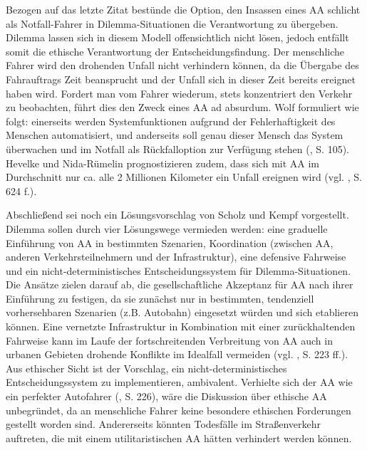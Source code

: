 \documentclass[a4paper, 12pt, titlepage]{scrartcl}
\begin{document}
	Bezogen auf das letzte Zitat best\"unde die Option, den Insassen eines AA schlicht als \glqq Notfall-Fahrer\grqq{} in Dilemma-Situationen die Verantwortung zu \"ubergeben. Dilemma lassen sich in diesem Modell offensichtlich nicht l\"osen, jedoch entf\"allt somit die ethische Verantwortung der Entscheidungsfindung. Der menschliche Fahrer wird den drohenden Unfall nicht verhindern k\"onnen, da die \"Ubergabe des Fahrauftrags Zeit beansprucht und der Unfall sich in dieser Zeit bereits ereignet haben wird. Fordert man vom Fahrer wiederum, stets konzentriert den Verkehr zu beobachten, f\"uhrt dies den Zweck eines AA ad absurdum. Wolf \autocite{Wolf2015} formuliert wie folgt: \glqq einerseits werden Systemfunktionen aufgrund der Fehlerhaftigkeit des Menschen automatisiert, und anderseits soll genau dieser Mensch das System überwachen und im Notfall als Rückfalloption zur Verfügung stehen\grqq{} (\autocite{Wolf2015}, S. 105). Hevelke und Nida-R{\"u}melin \autocite{Hevelke2015} prognostizieren zudem, dass sich mit AA im Durchschnitt nur ca. alle 2 Millionen Kilometer ein Unfall ereignen wird (vgl. \autocite{Hevelke2015}, S. 624 f.). 
	
	Abschlie\ss end sei noch ein L\"osungsvorschlag von Scholz und Kempf \autocite{Scholz2016} vorgestellt. Dilemma sollen durch vier L\"osungswege vermieden werden: eine graduelle Einf\"uhrung von AA in bestimmten Szenarien, Koordination (zwischen AA, anderen Verkehrsteilnehmern und der Infrastruktur), eine defensive Fahrweise und ein nicht-deterministisches Entscheidungssystem f\"ur Dilemma-Situationen. Die Ans\"atze zielen darauf ab, die gesellschaftliche Akzeptanz f\"ur AA nach ihrer Einf\"uhrung zu festigen, da sie zun\"achst nur in bestimmten, tendenziell vorhersehbaren Szenarien (z.B. Autobahn) eingesetzt w\"urden und sich etablieren k\"onnen. Eine vernetzte Infrastruktur in Kombination mit einer zur\"uckhaltenden Fahrweise kann im Laufe der fortschreitenden Verbreitung von AA auch in urbanen Gebieten drohende Konflikte im Idealfall vermeiden (vgl. \autocite{Scholz2016}, S. 223 ff.). Aus ethischer Sicht ist der Vorschlag, ein nicht-deterministisches Entscheidungssystem zu implementieren, ambivalent. Verhielte sich der AA \glqq wie ein perfekter Autofahrer\grqq{} (\autocite{Scholz2016}, S. 226), w\"are die Diskussion \"uber ethische AA unbegr\"undet, da an menschliche Fahrer keine besondere ethischen Forderungen gestellt worden sind. Andererseits k\"onnten Todesf\"alle im Stra\ss enverkehr auftreten, die mit einem utilitaristischen AA h\"atten verhindert werden k\"onnen. 
\end{document}
